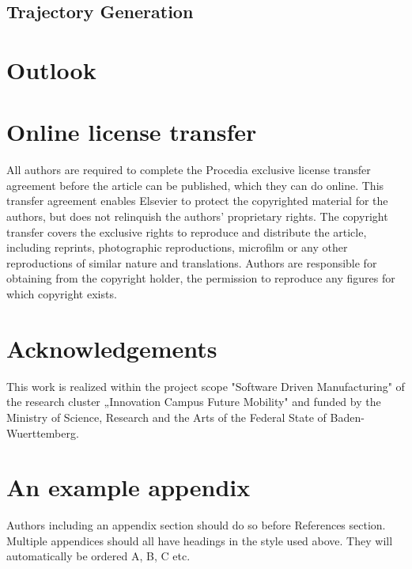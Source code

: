 \documentclass[5p,times,procedia]{elsarticle}
\begin{document}
\subsection{Trajectory Generation}

\section{Outlook}



\section{Online license transfer}
All authors are required to complete the Procedia exclusive license transfer agreement before the article can be published, which they can do online. This transfer agreement enables Elsevier to protect the copyrighted material for the authors, but does not relinquish the authors' proprietary rights. The copyright transfer covers the exclusive rights to reproduce and distribute the article, including reprints, photographic reproductions, microfilm or any other reproductions of similar nature and translations. Authors are responsible for obtaining from the copyright holder, the permission to reproduce any figures for which copyright exists.

\vfill\pagebreak

\section*{Acknowledgements}

 This work is realized within the project scope "Software Driven Manufacturing" of the research cluster „Innovation Campus Future Mobility" and funded by the Ministry of Science, Research and the Arts of the Federal State of Baden-Wuerttemberg.




\appendix
\section{An example appendix}
Authors including an appendix section should do so before References section. Multiple appendices should all have headings in the style used above. They will automatically be ordered A, B, C etc.
\end{document}
